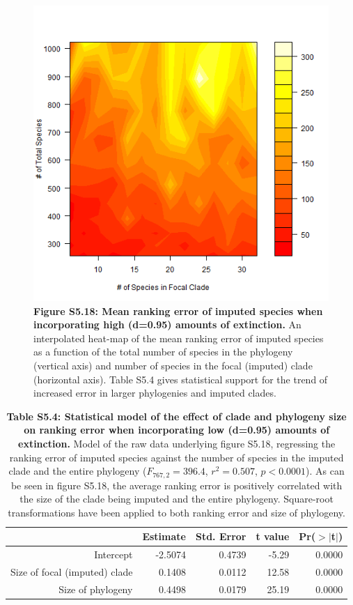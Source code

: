 \documentclass[10pt,english]{article}
\begin{document}
\begin{figure}[!ht]
  \center
  \includegraphics[width=.5\textwidth]{../figures/rankingErrorHighExtinction.png}
  \caption{\textbf{Figure S5.18: Mean ranking error of imputed species when
  incorporating high (d=0.95) amounts of extinction.} An interpolated heat-map of
  the mean ranking error of imputed species as a function of the total number of
  species in the phylogeny (vertical axis) and number of species in the focal
  (imputed) clade (horizontal axis). Table S5.4 gives statistical support for
  the trend of increased error in larger phylogenies and imputed clades.}
\end{figure}

\begin{table}[ht]
  \centering
  \begin{tabular}{rrrrr}
    \hline
    & Estimate & Std. Error & t value & Pr($>$$|$t$|$) \\ \hline
    Intercept & -2.5074 & 0.4739 & -5.29 & 0.0000 \\
    Size of focal (imputed) clade & 0.1408 & 0.0112 & 12.58 & 0.0000 \\
    Size of phylogeny & 0.4498 & 0.0179 & 25.19 & 0.0000 \\
    \hline
  \end{tabular}
  \caption{\textbf{Table S5.4: Statistical model of the effect of clade and
      phylogeny size on ranking error when incorporating low (d=0.95) amounts of
      extinction.} Model of the raw data underlying figure S5.18, regressing the
      ranking error of imputed species against the number of species in the
      imputed clade and the entire phylogeny ($F_{767,2} = 396.4$, $r^2 =
      0.507$, $p < 0.0001$). As can be seen in figure S5.18, the average
      ranking error is positively correlated with the size of the clade being
      imputed and the entire phylogeny. Square-root transformations have been
      applied to both ranking error and size of phylogeny.}
\end{table}
\end{document}
